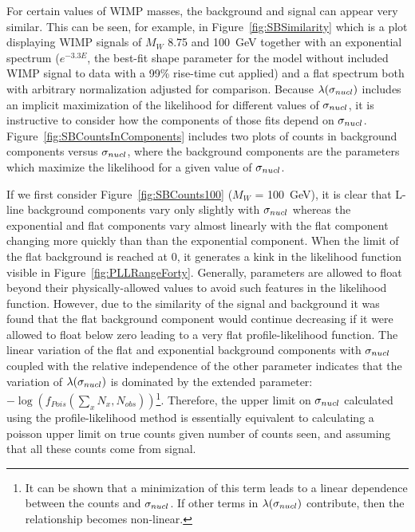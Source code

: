 For certain values of WIMP masses, the background and 	signal can appear very similar.  This can be seen, for example, in Figure~\ref{fig:SBSimilarity} which is a plot displaying WIMP signals of $M_{W}$ 8.75 and 100~GeV together with an exponential spectrum ($e^{-3.3 E}$, the best-fit shape parameter for the model without included WIMP signal to data with a 99\% rise-time cut applied) and a flat spectrum both with arbitrary normalization adjusted for comparison.  Because $\lambda(\sigma_{nucl})$ includes an implicit maximization of the likelihood for different values of $\sigma_{nucl}$, it is instructive to consider how the components of those fits depend on $\sigma_{nucl}$.  Figure~\ref{fig:SBCountsInComponents} includes two plots of counts in background components versus $\sigma_{nucl}$, where the background components are the parameters which maximize the likelihood for a given value of $\sigma_{nucl}$.  %

If we first consider Figure~\ref{fig:SBCounts100} ($M_{W}$ = 100~GeV), it is clear that L-line background components vary only slightly with $\sigma_{nucl}$ whereas the exponential and flat components vary almost linearly with the flat component changing more quickly than than the exponential component.  When the limit of the flat background is reached at 0, it generates a kink in the likelihood function visible in Figure~\ref{fig:PLLRangeForty}.  Generally, parameters are allowed to float beyond their physically-allowed values to avoid such features in the likelihood function.  However, due to the similarity of the signal and background it was found that the flat background component would continue decreasing if it were allowed to float below zero leading to a very flat profile-likelihood function.  The linear variation of the flat and exponential background components with $\sigma_{nucl}$ coupled with the relative independence of the other parameter indicates that the variation of $\lambda(\sigma_{nucl})$ is dominated by the extended parameter: $-\log \left( f_{Pois} \left( \sum_{x} N_{x}, N_{obs} \right) \right)$\footnote{It can be shown that a minimization of this term leads to a linear dependence between the counts and $\sigma_{nucl}$.  If other terms in $\lambda(\sigma_{nucl})$ contribute, then the relationship becomes non-linear.}.  Therefore, the upper limit on $\sigma_{nucl}$ calculated using the profile-likelihood method is essentially equivalent to calculating a poisson upper limit on true counts given number of counts seen, and assuming that all these counts come from signal.  %

